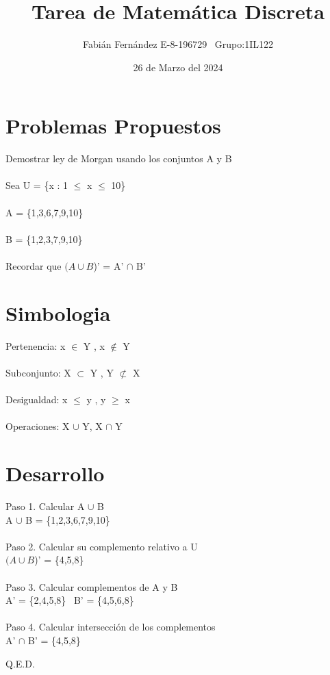 \documentclass[]{article}
\title{Tarea de Matemática Discreta}
\author{Fabián Fernández E-8-196729   \,\,\,Grupo:1IL122}
\date{26 de Marzo del 2024}
\begin{document}
\maketitle

\section*{Problemas Propuestos}
Demostrar ley de Morgan usando los conjuntos A y B \\ \\
Sea U = \{x : 1 $\leq$ x $\leq$ 10\} \\ \\
A = \{1,3,6,7,9,10\} \\ \\
B = \{1,2,3,7,9,10\} \\ \\
Recordar que \((A\cup B\))' = A' $\cap$ B'

\section*{Simbologia}
Pertenencia: x $\in$ Y , x $\notin$ Y \\ \\
Subconjunto: X $\subset$ Y , Y $\not\subset$ X \\ \\
Desigualdad: x $\leq$ y , y $\geq$ x \\ \\
Operaciones: X $\cup$ Y, X $\cap$ Y

\section*{Desarrollo}
Paso 1. Calcular A $\cup$ B \\ 
A $\cup$ B = \{1,2,3,6,7,9,10\} \\ \\
Paso 2. Calcular su complemento relativo a U\\
\((A \cup B\))' = \{4,5,8\} \\ \\
Paso 3. Calcular complementos de A y B \\
A' = \{2,4,5,8\} \, B' = \{4,5,6,8\}\\ \\
Paso 4. Calcular intersección de los complementos \\
A' $\cap$ B' = \{4,5,8\} \\ 

\begin{flushright}
Q.E.D.
\end{flushright}
\end{document}
